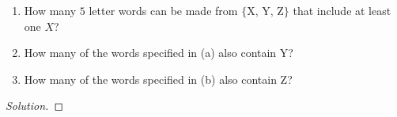 \documentclass[10pt, a4paper]{article}
\begin{document}
\begin{problem}[Q11]
    \begin{enumerate}[label = (\alph*)]
        \item How many $5$ letter words can be made from $\{\text{X, Y, Z}\}$ that include at least one $X$?
        \item How many of the words specified in (a) also contain Y?
        \item How many of the words specified in (b) also contain Z?
    \end{enumerate}

    \begin{proof}[Solution]\renewcommand{\qedsymbol}{}
        
    \end{proof}
\end{problem}

\newpage
\end{document}
